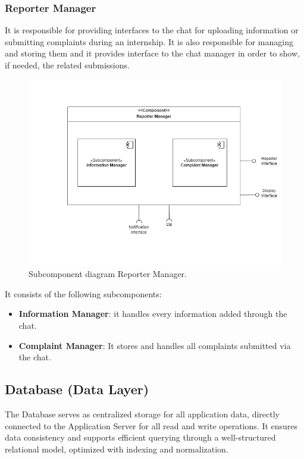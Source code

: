 \subsubsection{Reporter Manager} It is responsible for providing interfaces to the chat for uploading information or submitting complaints during an internship. It is also responsible for managing and storing them and it provides interface to the chat manager in order to show, if needed, the related submissions.
\begin{figure}[H]
    \centering
    \includegraphics[width=\linewidth]{DD/Images/Comp&Sub/ComplaintManager.png}
    \caption{Subcomponent diagram Reporter Manager.}
    \label{fig:report_manager}
    \end{figure}
    
It consists of the following subcomponents:
\begin{itemize}
    \item  \textbf{Information Manager}: it handles every information added through the chat.
    \item  \textbf{Complaint Manager}: It stores and handles all complaints submitted via the chat.
    \end{itemize}

\clearpage %

\subsection{Database (Data Layer)}
\label{subsec:data_layer}%

The Database serves as centralized storage for all application data, directly connected to the Application Server for all read and write operations. It ensures data consistency and supports efficient querying through a well-structured relational model, optimized with indexing and normalization. 

